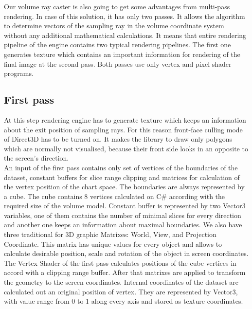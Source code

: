 \documentclass[twoside, english, 11pt]{report}
\begin{document}
Our volume ray caster is also going to get some advantages from multi-pass rendering. In case of this solution, it has only two passes. It allows the algorithm to determine vectors of the sampling ray in the volume coordinate system without any additional mathematical calculations. It means that entire rendering pipeline of the engine contains two typical rendering pipelines. The first one generates texture which contains an important information for rendering of the final image at the second pass. Both passes use only vertex and pixel shader programs.

\subsection{First pass}

At this step rendering engine has to generate texture which keeps an information about the exit position of sampling rays. For this reason front-face culling mode of Direct3D has to be turned on. It makes the library to draw only polygons which are normally not visualised, because their front side looks in an opposite to the screen's direction.\\

An input of the first pass contains only set of vertices of the boundaries of the dataset, constant buffers for slice range clipping and matrices for calculation of the vertex position of the chart space. The boundaries are always represented by a cube. The cube contains 8 vertices calculated on C\# according with the required size of the volume model. Constant buffer is represented by two Vector3 variables, one of them contains the number of minimal slices for every direction and another one keeps an information about maximal boundaries. We also have three traditional for 3D graphic Matrixes: World, View, and Projection Coordinate. This matrix has unique values for every object and allows to calculate desirable position, scale and rotation of the object in screen coordinates.\\

The Vertex Shader of the first pass calculates positions of the cube vertices in accord with a clipping range buffer. After that matrixes are applied to transform the geometry to the screen coordinates. Internal coordinates of the dataset are calculated out an original position of vertex. They are represented by Vector3, with value range from 0 to 1 along every axis and stored as texture coordinates.\\
\end{document}
